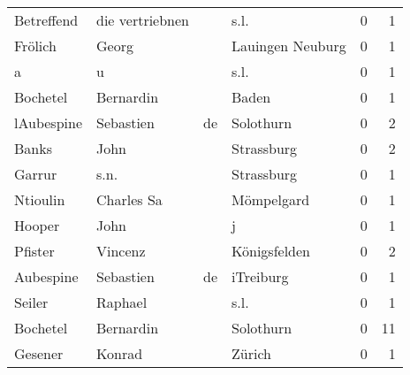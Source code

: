 \begin{tabular}{llllrr}
               Betreffend &                    die vertriebnen &             &                                        s.l. &          0 &         1 \\
                  Frölich &                              Georg &             &                            Lauingen Neuburg &          0 &         1 \\
                        a &                                  u &             &                                        s.l. &          0 &         1 \\
                 Bochetel &                          Bernardin &             &                                       Baden &          0 &         1 \\
               lAubespine &                          Sebastien &          de &                                   Solothurn &          0 &         2 \\
                    Banks &                               John &             &                                  Strassburg &          0 &         2 \\
                   Garrur &                               s.n. &             &                                  Strassburg &          0 &         1 \\
                 Ntioulin &                         Charles Sa &             &                                  Mömpelgard &          0 &         1 \\
                   Hooper &                               John &             &                                           j &          0 &         1 \\
                  Pfister &                            Vincenz &             &                                Königsfelden &          0 &         2 \\
                Aubespine &                          Sebastien &          de &                                   iTreiburg &          0 &         1 \\
                   Seiler &                            Raphael &             &                                        s.l. &          0 &         1 \\
                 Bochetel &                          Bernardin &             &                                   Solothurn &          0 &        11 \\
                  Gesener &                             Konrad &             &                                      Zürich &          0 &         1 \\

\end{tabular}
